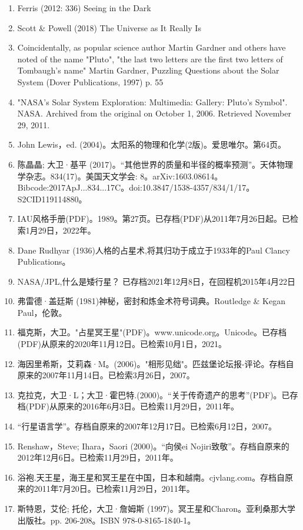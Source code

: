 \begin{enumerate}
\item Ferris (2012: 336) Seeing in the Dark
\item Scott & Powell (2018) The Universe as It Really Is
\item Coincidentally, as popular science author Martin Gardner and others have noted of the name "Pluto", "the last two letters are the first two letters of Tombaugh's name" Martin Gardner, Puzzling Questions about the Solar System (Dover Publications, 1997) p. 55
\item "NASA's Solar System Exploration: Multimedia: Gallery: Pluto's Symbol". NASA. Archived from the original on October 1, 2006. Retrieved November 29, 2011.
\item John Lewis，ed. (2004)。太阳系的物理和化学(2版)。爱思唯尔。第64页。
\item 陈晶晶; 大卫·基平 (2017)。“其他世界的质量和半径的概率预测”。天体物理学杂志。834(17)。美国天文学会: 8。arXiv:1603.08614。Bibcode:2017ApJ...834...17C。doi:10.3847/1538-4357/834/1/17。S2CID119114880。 
\item IAU风格手册(PDF)。1989。第27页。已存档(PDF)从2011年7月26日起。已检索1月29日，2022年。
\item Dane Rudhyar (1936)人格的占星术,将其归功于成立于1933年的Paul Clancy Publications。
\item NASA/JPL,什么是矮行星？ 已存档2021年12月8日，在回程机2015年4月22日
\item 弗雷德·盖廷斯 (1981)神秘，密封和炼金术符号词典。Routledge & Kegan Paul，伦敦。
\item 福克斯，大卫。"占星冥王星"(PDF)。www.unicode.org。Unicode。已存档(PDF)从原来的2020年11月12日。已检索10月1日，2021。
\item 海因里希斯，艾莉森·M。(2006)。"相形见绌"。匹兹堡论坛报-评论。存档自原来的2007年11月14日。已检索3月26日，2007。
\item 克拉克，大卫·L；大卫·霍巴特.(2000)。“关于传奇遗产的思考”(PDF)。已存档(PDF)从原来的2016年6月3日。已检索11月29日，2011年。
\item “行星语言学”。存档自原来的2007年12月17日。已检索6月12日，2007。
\item Renshaw，Steve; Ihara，Saori (2000)。“向侯ei Nojiri致敬”。存档自原来的2012年12月6日。已检索11月29日，2011年。
\item 浴袍.天王星，海王星和冥王星在中国，日本和越南。cjvlang.com。存档自原来的2011年7月20日。已检索11月29日，2011年。
\item 斯特恩，艾伦; 托伦，大卫·詹姆斯 (1997)。冥王星和Charon。亚利桑那大学出版社。pp. 206-208。ISBN 978-0-8165-1840-1。

\end{enumerate}
